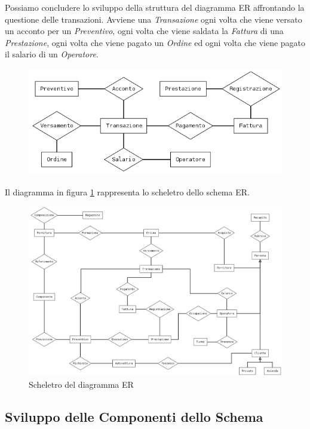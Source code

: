 		Possiamo concludere lo sviluppo della struttura del diagramma ER affrontando la questione delle transazioni. Avviene una \emph{Transazione} ogni volta che viene versato un acconto per un \emph{Preventivo}, ogni volta che viene saldata la \emph{Fattura} di una \emph{Prestazione}, ogni volta che viene pagato un \emph{Ordine} ed ogni volta che viene pagato il salario di un \emph{Operatore}.
		
		\begin{figure}[H]
			\centering
			\includegraphics[width=12cm]{images/diagrams/transazione.png}
		\end{figure}
			
		Il diagramma in figura \ref{fig:scheletro_er} rappresenta lo scheletro dello schema ER.
		
		\begin{figure}
			\centering
			\includegraphics[width=20cm]{images/diagrams/schema.png}
			\caption{Scheletro del diagramma ER}
			\label{fig:scheletro_er}
		\end{figure}
	
	\subsection{Sviluppo delle Componenti dello Schema}
	
